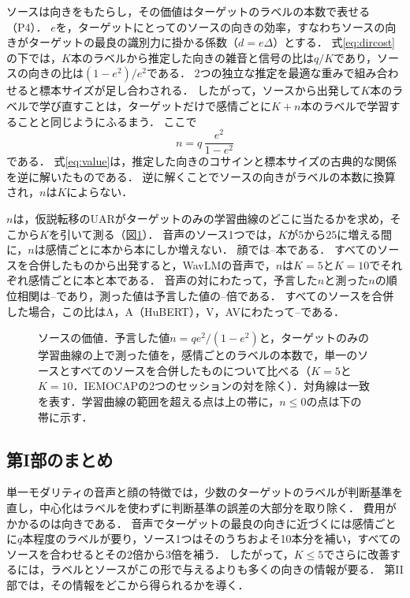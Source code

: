 ソースは向きをもたらし，その価値はターゲットのラベルの本数で表せる（P4）．
$e$を，ターゲットにとってのソースの向きの効率，すなわちソースの向きがターゲットの最良の識別力に掛かる係数（$d = e\Delta$）とする．
式\eqref{eq:dircost}の下では，$K$本のラベルから推定した向きの雑音と信号の比は$q/K$であり，ソースの向きの比は$(1 - e^2)/e^2$である．
2つの独立な推定を最適な重みで組み合わせると標本サイズが足し合わされる．
したがって，ソースから出発して$K$本のラベルで学び直すことは，ターゲットだけで感情ごとに$K + n$本のラベルで学習することと同じようにふるまう．
ここで
\begin{equation}
\label{eq:value}
n = q\,\frac{e^2}{1 - e^2}
\end{equation}
である．
式\eqref{eq:value}は，推定した向きのコサインと標本サイズの古典的な関係\cite{raudys1998intrinsic,dobriban2018highdimensional}を逆に解いたものである．
逆に解くことでソースの向きがラベルの本数に換算され，$n$は$K$によらない．

$n$は，仮説転移のUARがターゲットのみの学習曲線のどこに当たるかを求め，そこから$K$を引いて測る（図\ref{fig:sourcevalue}）．
音声のソース1つでは，$K$が$5$から$25$に増える間に，$n$は感情ごとに本から本にしか増えない．
顔では--本である．
すべてのソースを合併したものから出発すると，WavLMの音声で，$n$は$K=5$と$K=10$でそれぞれ感情ごとに本と本である．
音声の対にわたって，予言した$n$と測った$n$の順位相関は--であり，測った値は予言した値の--倍である．
すべてのソースを合併した場合，この比はA，A（HuBERT），V，AVにわたって--である．

\begin{figure}[t]
\centering
{}
\caption{ソースの価値．予言した値$n = q e^2/(1-e^2)$と，ターゲットのみの学習曲線の上で測った値を，感情ごとのラベルの本数で，単一のソースとすべてのソースを合併したものについて比べる（$K=5$と$K=10$．IEMOCAPの2つのセッションの対を除く）．対角線は一致を表す．学習曲線の範囲を超える点は上の帯に，$n \le 0$の点は下の帯に示す．}
\label{fig:sourcevalue}
\end{figure}

\subsection{第I部のまとめ}
\label{sec:part1-summary}

単一モダリティの音声と顔の特徴では，少数のターゲットのラベルが判断基準を直し，中心化はラベルを使わずに判断基準の誤差の大部分を取り除く．
費用がかかるのは向きである．
音声でターゲットの最良の向きに近づくには感情ごとに$q$本程度のラベルが要り，ソース1つはそのうちおよそ10本分を補い，すべてのソースを合わせるとその2倍から3倍を補う．
したがって，$K \le 5$でさらに改善するには，ラベルとソースがこの形で与えるよりも多くの向きの情報が要る．
第II部では，その情報をどこから得られるかを導く．

